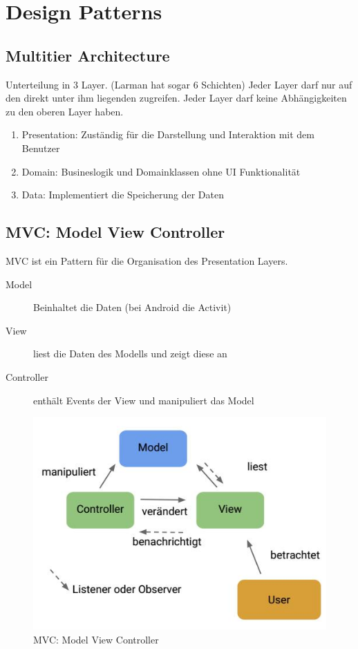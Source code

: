 \section{Design Patterns}
\subsection{Multitier Architecture}
Unterteilung in 3 Layer. (Larman hat sogar 6 Schichten) Jeder Layer darf nur auf den direkt unter ihm liegenden zugreifen. Jeder Layer darf keine Abhängigkeiten zu den oberen Layer haben.
\begin{enumerate}
	\item Presentation: Zuständig für die Darstellung und Interaktion mit dem Benutzer
	\item Domain: Busineslogik und Domainklassen ohne UI Funktionalität
	\item Data: Implementiert die Speicherung der Daten
\end{enumerate}


\subsection{MVC: Model View Controller}
MVC ist ein Pattern für die Organisation des Presentation Layers.
\begin{description}
	\item[Model] Beinhaltet die Daten (bei Android die Activit)
	\item[View] liest die Daten des Modells und zeigt diese an
	\item[Controller] enthält Events der View und manipuliert das Model
\end{description}

\begin{figure}[h]
\centering
\includegraphics[width=0.7\linewidth]{images/mvc}
\caption{MVC: Model View Controller}
\label{fig:mvc}
\end{figure}



